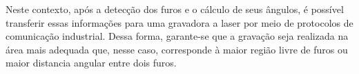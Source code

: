 \documentclass[conference]{IEEEtran}
\begin{document}
Neste contexto, após a detecção dos furos e o cálculo de seus ângulos, é possível transferir essas informações para uma gravadora a laser por meio de protocolos de comunicação industrial. Dessa forma, garante-se que a gravação seja realizada na área mais adequada que, nesse caso, corresponde à maior região livre de furos ou maior distancia angular entre dois furos. 





\end{document}
